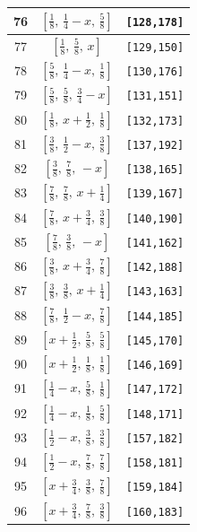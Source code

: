 \documentclass[fleqn,8pt]{jsarticle}
\begin{document}
\begin{longtable}{ccc}
76 & $\left[ \frac{1}{8},\, \frac{1}{4} - x,\, \frac{5}{8} \right]$ & {\tt [128,178]} \\ \hline
77 & $\left[ \frac{1}{8},\, \frac{5}{8},\, x \right]$ & {\tt [129,150]} \\ \hline
78 & $\left[ \frac{5}{8},\, \frac{1}{4} - x,\, \frac{1}{8} \right]$ & {\tt [130,176]} \\ \hline
79 & $\left[ \frac{5}{8},\, \frac{5}{8},\, \frac{3}{4} - x \right]$ & {\tt [131,151]} \\ \hline
80 & $\left[ \frac{1}{8},\, x + \frac{1}{2},\, \frac{1}{8} \right]$ & {\tt [132,173]} \\ \hline
81 & $\left[ \frac{3}{8},\, \frac{1}{2} - x,\, \frac{3}{8} \right]$ & {\tt [137,192]} \\ \hline
82 & $\left[ \frac{3}{8},\, \frac{7}{8},\, - x \right]$ & {\tt [138,165]} \\ \hline
83 & $\left[ \frac{7}{8},\, \frac{7}{8},\, x + \frac{1}{4} \right]$ & {\tt [139,167]} \\ \hline
84 & $\left[ \frac{7}{8},\, x + \frac{3}{4},\, \frac{3}{8} \right]$ & {\tt [140,190]} \\ \hline
85 & $\left[ \frac{7}{8},\, \frac{3}{8},\, - x \right]$ & {\tt [141,162]} \\ \hline
86 & $\left[ \frac{3}{8},\, x + \frac{3}{4},\, \frac{7}{8} \right]$ & {\tt [142,188]} \\ \hline
87 & $\left[ \frac{3}{8},\, \frac{3}{8},\, x + \frac{1}{4} \right]$ & {\tt [143,163]} \\ \hline
88 & $\left[ \frac{7}{8},\, \frac{1}{2} - x,\, \frac{7}{8} \right]$ & {\tt [144,185]} \\ \hline
89 & $\left[ x + \frac{1}{2},\, \frac{5}{8},\, \frac{5}{8} \right]$ & {\tt [145,170]} \\ \hline
90 & $\left[ x + \frac{1}{2},\, \frac{1}{8},\, \frac{1}{8} \right]$ & {\tt [146,169]} \\ \hline
91 & $\left[ \frac{1}{4} - x,\, \frac{5}{8},\, \frac{1}{8} \right]$ & {\tt [147,172]} \\ \hline
92 & $\left[ \frac{1}{4} - x,\, \frac{1}{8},\, \frac{5}{8} \right]$ & {\tt [148,171]} \\ \hline
93 & $\left[ \frac{1}{2} - x,\, \frac{3}{8},\, \frac{3}{8} \right]$ & {\tt [157,182]} \\ \hline
94 & $\left[ \frac{1}{2} - x,\, \frac{7}{8},\, \frac{7}{8} \right]$ & {\tt [158,181]} \\ \hline
95 & $\left[ x + \frac{3}{4},\, \frac{3}{8},\, \frac{7}{8} \right]$ & {\tt [159,184]} \\ \hline
96 & $\left[ x + \frac{3}{4},\, \frac{7}{8},\, \frac{3}{8} \right]$ & {\tt [160,183]} \\
\end{longtable}
\end{document}

